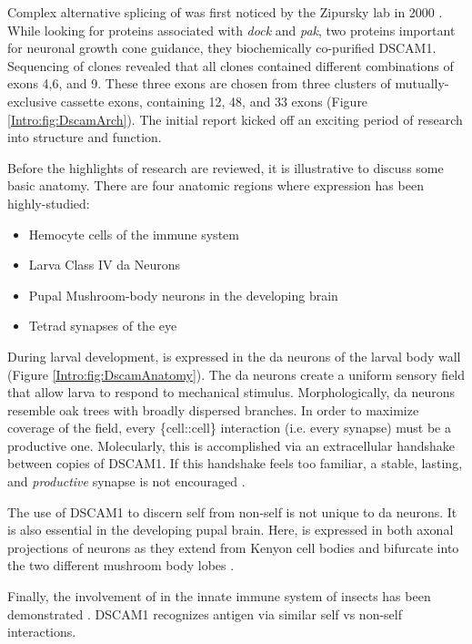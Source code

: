     Complex alternative splicing of\dscam{} was first noticed by the Zipursky lab in 2000 \citep{Schmucker2000}. While looking for proteins associated with \textit{dock} and \textit{pak}, two proteins important for neuronal growth cone guidance, they biochemically co-purified DSCAM1. Sequencing of \dscam{} clones revealed that all clones contained different combinations of exons 4,6, and 9. These three exons are chosen from three clusters of mutually-exclusive cassette exons, containing 12, 48, and 33 exons (Figure \ref{Intro:fig:DscamArch}). The initial report kicked off an exciting period of research into \dscam{} structure and function.

    Before the highlights of \dscam{} research are reviewed, it is illustrative to discuss some basic \flies{} anatomy. There are four anatomic regions where \dscam{} expression has been highly-studied:

    \begin{itemize} \itemsep0.5pt \parskip0pt  %
      \singlespacing
      \item Hemocyte cells of the immune system
      \item Larva Class IV da Neurons 
      \item Pupal Mushroom-body neurons in the developing brain
      \item Tetrad synapses of the eye
      \end{itemize}

    During larval development, \dscam{} is expressed in the da neurons of the larval body wall (Figure \ref{Intro:fig:DscamAnatomy}). The da neurons create a uniform sensory field that allow larva to respond to mechanical stimulus. Morphologically, da neurons resemble oak trees with broadly dispersed branches. In order to maximize coverage of the field, every \{cell::cell\} interaction (i.e. every synapse) must be a productive one. Molecularly, this is accomplished via an extracellular handshake between copies of DSCAM1. If this handshake feels too familiar, a stable, lasting, and \textit{productive} synapse is not encouraged \citep{Wojtowicz2004}. 

    The use of DSCAM1 to discern self from non-self is not unique to da neurons. It is also essential in the developing pupal brain. Here, \dscam{} is expressed in both axonal projections of neurons as they extend from Kenyon cell bodies and bifurcate into the two different mushroom body lobes \citep{Zhan2004}. 

    Finally, the involvement of \dscam{} in the innate immune system of insects has been demonstrated \citep{Watson2005,Dong2006}. DSCAM1 recognizes antigen via similar self vs non-self interactions.

